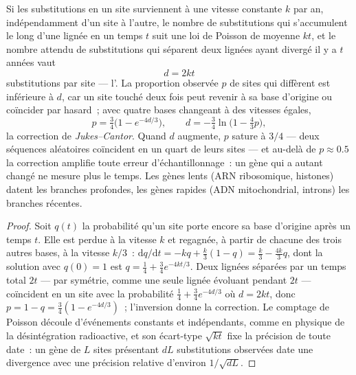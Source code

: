 \begin{theorem}\label{thm:b2:phylogenetic-trees:clock}
Si les substitutions en un site surviennent à une vitesse constante $k$
par an, indépendamment d'un site à l'autre, le nombre de substitutions
qui s'accumulent le long d'une lignée en un temps $t$ suit une loi de
Poisson de moyenne $kt$, et le nombre attendu de substitutions qui
séparent deux lignées ayant divergé il y a $t$ années vaut
\[
d = 2kt
\]
substitutions par site --- l'\emph{}. La proportion
observée $p$ de sites qui diffèrent est inférieure à $d$, car un
site touché deux fois peut revenir à sa base d'origine ou coïncider par
hasard~; avec quatre bases changeant à des vitesses égales,
\[
p = \tfrac{3}{4}\bigl(1 - e^{-4d/3}\bigr), \qquad
d = -\tfrac{3}{4}\ln\bigl(1 - \tfrac{4}{3}p\bigr),
\]
la correction de \emph{Jukes--Cantor}. Quand $d$ augmente, $p$ sature à
$3/4$ --- deux séquences aléatoires coïncident en un quart de leurs sites
--- et au-delà de $p \approx 0.5$ la correction amplifie toute erreur
d'échantillonnage~: un gène qui a autant changé ne mesure plus le temps.
Les gènes lents (ARN ribosomique, histones) datent les branches
profondes, les gènes rapides (ADN mitochondrial, introns) les branches
récentes.
\end{theorem}
\begin{proof}
Soit $q(t)$ la probabilité qu'un site porte encore sa base d'origine
après un temps $t$. Elle est perdue à la vitesse $k$ et regagnée, à partir
de chacune des trois autres bases, à la vitesse $k/3$~:
$\mathrm{d}q/\mathrm{d}t = -kq + \tfrac{k}{3}(1 - q) = \tfrac{k}{3} -
\tfrac{4k}{3}q$, dont la solution avec $q(0) = 1$ est $q = \tfrac14 +
\tfrac34 e^{-4kt/3}$. Deux lignées séparées par un temps total $2t$ ---
par symétrie, comme une seule lignée évoluant pendant $2t$ --- coïncident
en un site avec la probabilité $\tfrac14 + \tfrac34 e^{-4d/3}$ où $d =
2kt$, donc $p = 1 - q = \tfrac34(1 - e^{-4d/3})$~; l'inversion donne la
correction. Le comptage de Poisson découle d'événements constants et
indépendants, comme en physique de la désintégration radioactive, et son
écart-type $\sqrt{kt}$ fixe la précision de toute date~: un gène de $L$
sites présentant $dL$ substitutions observées date une divergence avec
une précision relative d'environ $1/\sqrt{dL}$.
\end{proof}
